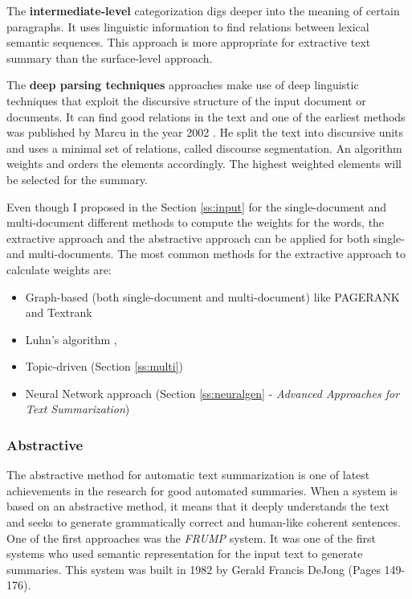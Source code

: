 The \textbf{intermediate-level} categorization digs deeper into the meaning of certain paragraphs. It uses linguistic information to find relations between lexical semantic sequences. This approach is more appropriate for extractive text summary than the surface-level approach.

The \textbf{deep parsing techniques} approaches make use of deep linguistic techniques that exploit the discursive structure of the input document or documents. It can find good relations in the text and one of the earliest methods was published by Marcu in the year 2002 \cite{marcu}. He split the text into discursive units and uses a minimal set of relations, called discourse segmentation. An algorithm weights and orders the elements accordingly. The highest weighted elements will be selected for the summary.

Even though I proposed in the Section \ref{ss:input} for the single-document and multi-document different methods to compute the weights for the words, the extractive approach and the abstractive approach can be applied for both single- and multi-documents. The most common methods for the extractive approach to calculate weights are:

\begin{itemize}
	\item Graph-based (both single-document and multi-document) like PAGERANK and Textrank
	\item Luhn's algorithm \cite{textmining1958}, 
	\item Topic-driven (Section \ref{ss:multi}) 
	\item Neural Network approach (Section \ref{ss:neuralgen} - \textit{Advanced Approaches for Text Summarization})
\end{itemize}

\subsubsection{Abstractive}

The abstractive method for automatic text summarization is one of latest achievements in the research for good automated summaries. When a system is based on an abstractive method, it means that it deeply understands the text and seeks to generate grammatically correct and human-like coherent sentences. One of the first approaches was the \textit{FRUMP} system. It was one of the first systems who used semantic representation for the input text to generate summaries. This system was built in 1982 by Gerald Francis DeJong \cite{Dej82} (Pages 149-176).


